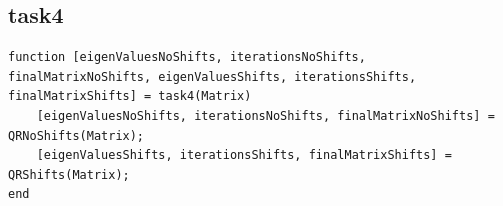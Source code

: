 \subsection{task4}
\begin{simplechar}
\begin{lstlisting}
function [eigenValuesNoShifts, iterationsNoShifts, finalMatrixNoShifts, eigenValuesShifts, iterationsShifts, finalMatrixShifts] = task4(Matrix)
    [eigenValuesNoShifts, iterationsNoShifts, finalMatrixNoShifts] = QRNoShifts(Matrix);
    [eigenValuesShifts, iterationsShifts, finalMatrixShifts] = QRShifts(Matrix);
end
\end{lstlisting}
\end{simplechar}

